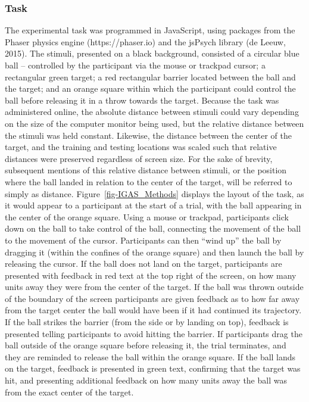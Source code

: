 \documentclass[
  12pt,
  letterpaper,
]{article}
\begin{document}
\subsubsection{Task}\label{task}

The experimental task was programmed in JavaScript, using packages from
the Phaser physics engine (https://phaser.io) and the jsPsych library
(de Leeuw, 2015). The stimuli, presented on a black background,
consisted of a circular blue ball -- controlled by the participant via
the mouse or trackpad cursor; a rectangular green target; a red
rectangular barrier located between the ball and the target; and an
orange square within which the participant could control the ball before
releasing it in a throw towards the target. Because the task was
administered online, the absolute distance between stimuli could vary
depending on the size of the computer monitor being used, but the
relative distance between the stimuli was held constant. Likewise, the
distance between the center of the target, and the training and testing
locations was scaled such that relative distances were preserved
regardless of screen size. For the sake of brevity, subsequent mentions
of this relative distance between stimuli, or the position where the
ball landed in relation to the center of the target, will be referred to
simply as distance. Figure~\ref{fig-IGAS_Methods} displays the layout of
the task, as it would appear to a participant at the start of a trial,
with the ball appearing in the center of the orange square. Using a
mouse or trackpad, participants click down on the ball to take control
of the ball, connecting the movement of the ball to the movement of the
cursor. Participants can then ``wind up'' the ball by dragging it
(within the confines of the orange square) and then launch the ball by
releasing the cursor. If the ball does not land on the target,
participants are presented with feedback in red text at the top right of
the screen, on how many units away they were from the center of the
target. If the ball was thrown outside of the boundary of the screen
participants are given feedback as to how far away from the target
center the ball would have been if it had continued its trajectory. If
the ball strikes the barrier (from the side or by landing on top),
feedback is presented telling participants to avoid hitting the barrier.
If participants drag the ball outside of the orange square before
releasing it, the trial terminates, and they are reminded to release the
ball within the orange square. If the ball lands on the target, feedback
is presented in green text, confirming that the target was hit, and
presenting additional feedback on how many units away the ball was from
the exact center of the target.
\end{document}
